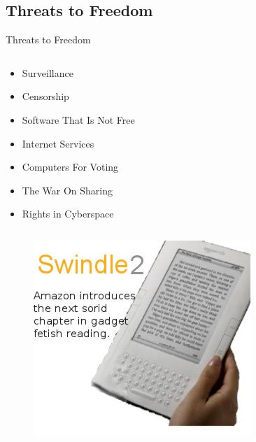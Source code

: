 \subsection{Threats to Freedom}
\begin{frame}{Threats to Freedom}
  \begin{column}{0.45\textwidth}
    \begin{itemize}
      \item Surveillance
      \item Censorship
      \item Software That Is Not Free
      \item Internet Services
      \item Computers For Voting
      \item The War On Sharing
      \item Rights in Cyberspace
    \end{itemize}
  \end{column}
  \begin{column}{0.5\textwidth}\raggedleft{}
    \begin{figure}
      \includegraphics[width=\textwidth]{images/swindle.jpg}
      \caption{\Protect\cite{swindle}}
    \end{figure}
  \end{column}
\end{frame}

